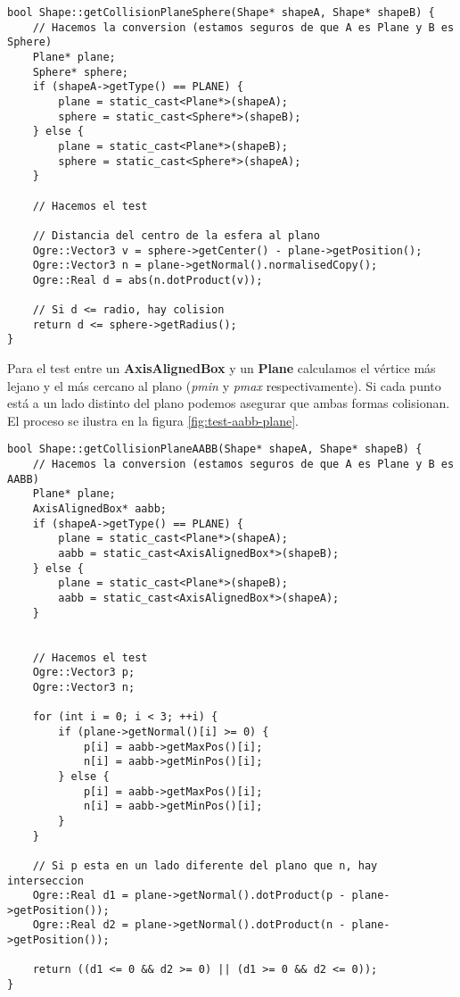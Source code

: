 
\begin{lstlisting}[style=C++]
bool Shape::getCollisionPlaneSphere(Shape* shapeA, Shape* shapeB) {
    // Hacemos la conversion (estamos seguros de que A es Plane y B es Sphere)
    Plane* plane;
    Sphere* sphere;
    if (shapeA->getType() == PLANE) {
        plane = static_cast<Plane*>(shapeA);
        sphere = static_cast<Sphere*>(shapeB);
    } else {
        plane = static_cast<Plane*>(shapeB);
        sphere = static_cast<Sphere*>(shapeA);
    }

    // Hacemos el test
    
    // Distancia del centro de la esfera al plano
    Ogre::Vector3 v = sphere->getCenter() - plane->getPosition();
    Ogre::Vector3 n = plane->getNormal().normalisedCopy();
    Ogre::Real d = abs(n.dotProduct(v));

    // Si d <= radio, hay colision
    return d <= sphere->getRadius();
}
\end{lstlisting}

Para el test entre un \textbf{AxisAlignedBox} y un \textbf{Plane} calculamos
el vértice más lejano y el más cercano al plano (\textit{pmin} y \textit{pmax}
respectivamente). Si cada punto está a un lado distinto del plano podemos
asegurar que ambas formas colisionan. El proceso se ilustra en la figura
\ref{fig:test-aabb-plane}.\\


\begin{lstlisting}[style=C++]
bool Shape::getCollisionPlaneAABB(Shape* shapeA, Shape* shapeB) {
    // Hacemos la conversion (estamos seguros de que A es Plane y B es AABB)
    Plane* plane;
    AxisAlignedBox* aabb;
    if (shapeA->getType() == PLANE) {
        plane = static_cast<Plane*>(shapeA);
        aabb = static_cast<AxisAlignedBox*>(shapeB);
    } else {
        plane = static_cast<Plane*>(shapeB);
        aabb = static_cast<AxisAlignedBox*>(shapeA);
    }


    // Hacemos el test
    Ogre::Vector3 p;
    Ogre::Vector3 n;

    for (int i = 0; i < 3; ++i) {
        if (plane->getNormal()[i] >= 0) {
            p[i] = aabb->getMaxPos()[i];
            n[i] = aabb->getMinPos()[i];
        } else {
            p[i] = aabb->getMaxPos()[i];
            n[i] = aabb->getMinPos()[i];
        }
    }

    // Si p esta en un lado diferente del plano que n, hay interseccion
    Ogre::Real d1 = plane->getNormal().dotProduct(p - plane->getPosition());
    Ogre::Real d2 = plane->getNormal().dotProduct(n - plane->getPosition());

    return ((d1 <= 0 && d2 >= 0) || (d1 >= 0 && d2 <= 0));
}
\end{lstlisting}

